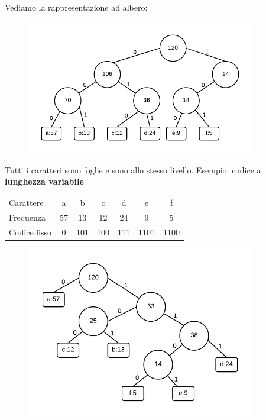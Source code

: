 Vediamo la rappresentazione ad albero:

\begin{figure}[htpd]
\centering
\includegraphics[width=100mm]{images/huff1.png}
\end{figure}

Tutti i caratteri sono foglie e sono allo stesso livello.
\linebreak
\linebreak
Esempio: codice a \textbf{lunghezza variabile}

\begin{center}
\begin{tabular}[htpd]{| l | c c c c c c |}

\hline
Carattere & a & b & c & d & e & f \\
Frequenza & 57 & 13 & 12 & 24 & 9 & 5 \\
Codice fisso & 0 & 101 & 100 & 111 & 1101 & 1100 \\
\hline
\end{tabular}
\end{center}

\begin{figure}[htpd]
\centering
\includegraphics[width=100mm]{images/huff3.png}
\end{figure}

